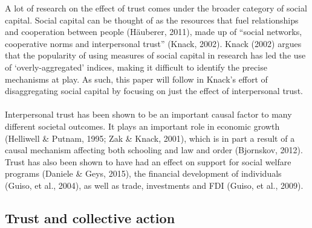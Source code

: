 \documentclass[
  11pt,
]{article}
\begin{document}
A lot of research on the effect of trust comes under the broader category of social capital. Social capital can be thought of as the resources that fuel relationships and cooperation between people (Häuberer, 2011), made up of ``social networks, cooperative norms and interpersonal trust'' (Knack, 2002). Knack (2002) argues that the popularity of using measures of social capital in research has led the use of `overly-aggregated' indices, making it difficult to identify the precise mechanisms at play. As such, this paper will follow in Knack's effort of disaggregating social capital by focusing on just the effect of interpersonal trust.\\
~\\
Interpersonal trust has been shown to be an important causal factor to many different societal outcomes. It plays an important role in economic growth (Helliwell \& Putnam, 1995; Zak \& Knack, 2001), which is in part a result of a causal mechanism affecting both schooling and law and order (Bjornskov, 2012). Trust has also been shown to have had an effect on support for social welfare programs (Daniele \& Geys, 2015), the financial development of individuals (Guiso, et al., 2004), as well as trade, investments and FDI (Guiso, et al., 2009).\\

\hypertarget{trust-and-collective-action}{%
\subsection{Trust and collective action}\label{trust-and-collective-action}}
\end{document}

